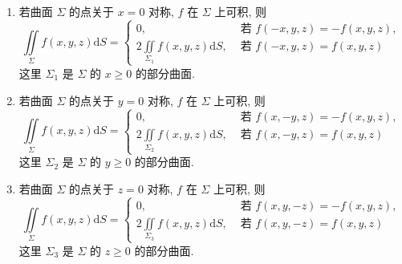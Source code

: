\begin{theorem}[偶倍奇零性]
    \begin{enumerate}[label=(\arabic{*})]
        \item 若曲面 $ \varSigma $ 的点关于 $ x=0 $ 对称, $f $ 在 $ \varSigma $ 上可积, 则
              $$\iint\limits_{\varSigma} f(x, y, z) \mathrm{d} S=\left\{\begin{array}{ll}
                      0,                                                                    & \text { 若 } f(-x, y, z)=-f(x, y, z), \\
                      \displaystyle 2 \iint\limits_{\varSigma_{1}} f(x, y, z) \mathrm{d} S, & \text { 若 } f(-x, y, z)=f(x, y, z)
                  \end{array}\right.$$
              这里 $ \varSigma_{1} $ 是 $ \varSigma $ 的 $ x \geqslant 0 $ 的部分曲面.
        \item 若曲面 $ \varSigma $ 的点关于 $ y=0 $ 对称, $f $ 在 $ \varSigma $ 上可积, 则
              $$\iint\limits_{\varSigma} f(x, y, z) \mathrm{d} S=\left\{\begin{array}{ll}
                      0,                                                                    & \text { 若 } f(x,-y, z)=-f(x, y, z), \\
                      \displaystyle 2 \iint\limits_{\varSigma_{2}} f(x, y, z) \mathrm{d} S, & \text { 若 } f(x,-y, z)=f(x, y, z)
                  \end{array}\right.$$
              这里 $ \varSigma_{2} $ 是 $ \varSigma $ 的 $ y \geqslant 0 $ 的部分曲面.
        \item 若曲面 $ \varSigma $ 的点关于 $ z=0 $ 对称, $f $ 在 $ \varSigma $ 上可积, 则
              $$\iint\limits_{\varSigma} f(x, y, z) \mathrm{d} S=\left\{\begin{array}{ll}
                      0,                                                                    & \text { 若 } f(x, y,-z)=-f(x, y, z), \\
                      \displaystyle 2 \iint\limits_{\varSigma_{3}} f(x, y, z) \mathrm{d} S, & \text { 若 } f(x, y,-z)=f(x, y, z)
                  \end{array}\right.$$
              这里 $ \varSigma_{3} $ 是 $ \varSigma $ 的 $ z \geqslant 0 $ 的部分曲面.
    \end{enumerate}
\end{theorem}

